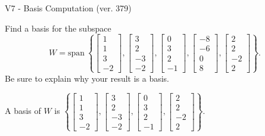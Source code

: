 \begin{exercise}
  \begin{exerciseTitle}V7 - Basis Computation (ver. 379)\end{exerciseTitle}
  \begin{exerciseStatement}
    Find a basis for the subspace 
\[W=\mathrm{span}\ \left\{\left[\begin{array}{r}
1 \\
1 \\
3 \\
-2
\end{array}\right] , \left[\begin{array}{r}
3 \\
2 \\
-3 \\
-2
\end{array}\right] , \left[\begin{array}{r}
0 \\
3 \\
2 \\
-1
\end{array}\right] , \left[\begin{array}{r}
-8 \\
-6 \\
0 \\
8
\end{array}\right] , \left[\begin{array}{r}
2 \\
2 \\
-2 \\
2
\end{array}\right]\right\}.\]
 Be sure to explain why your result is a basis.


  \end{exerciseStatement}
  \begin{exerciseAnswer}
   A basis of \(W\) is  \(\left\{\left[\begin{array}{r}
1 \\
1 \\
3 \\
-2
\end{array}\right] , \left[\begin{array}{r}
3 \\
2 \\
-3 \\
-2
\end{array}\right] , \left[\begin{array}{r}
0 \\
3 \\
2 \\
-1
\end{array}\right] , \left[\begin{array}{r}
2 \\
2 \\
-2 \\
2
\end{array}\right]\right\}\).
  


  \end{exerciseAnswer}
\end{exercise}